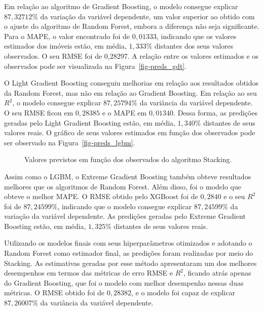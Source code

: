 \documentclass[
  12pt,
  a4paper,
]{scrreprt}
\begin{document}
\vspace{12pt}

Em relação ao algoritmo de Gradient Boosting, o modelo consegue explicar
\(87,32712\%\) da variação da variável dependente, um valor superior ao
obtido com o ajuste do algoritmo de Random Forest, embora a diferença
não seja significante. Para o MAPE, o valor encontrado foi de
\(0,01333\), indicando que os valores estimados dos imóveis estão, em
média, \(1,333\%\) distantes dos seus valores observados. O seu RMSE foi
de 0,28297. A relação entre os valores estimados e os observados pode
ser visualizada na Figura~\ref{fig-preds_gdt}.

\vspace{12pt}

O Light Gradient Boosting conseguiu melhorias em relação aos resultados
obtidos da Random Forest, mas não em relação ao Gradient Boosting. Em
relação ao seu \(R^2\), o modelo consegue explicar \(87,25794\%\) da
variância da variável dependente. O seu RMSE ficou em \(0,28385\) e o
MAPE em \(0,01340\). Dessa forma, as predições geradas pelo Light
Gradient Boosting estão, em média, \(1,340\%\) distantes de seus valores
reais. O gráfico de seus valores estimados em função dos observados pode
ser observado na Figura~\ref{fig-preds_lgbm}.

\begin{figure}


\caption{\label{fig-preds_stacking}Valores previstos em função dos
observados do algoritmo Stacking.}

\end{figure}%

Assim como o LGBM, o Extreme Gradient Boosting também obteve resultados
melhores que os algoritmos de Random Forest. Além disso, foi o modelo
que obteve o melhor MAPE. O RMSE obtido pelo XGBoost foi de \(0,2840\) e
o seu \(R^2\) foi de \(87,24599\%\), indicando que o modelo consegue
explicar \(87,24599\%\) da variação da variável dependente. As predições
geradas pelo Extreme Gradient Boosting estão, em média, \(1,325\%\)
distantes de seus valores reais.

\vspace{12pt}

Utilizando os modelos finais com seus hiperparâmetros otimizados e
adotando o Random Forest como estimador final, as predições foram
realizadas por meio do Stacking. As estimativas geradas por esse método
apresentaram um dos melhores desempenhos em termos das métricas de erro
RMSE e \(R^2\), ficando atrás apenas do Gradient Boosting, que foi o
modelo com melhor desempenho nessas duas métricas. O RMSE obtido foi de
\(0,28382\), e o modelo foi capaz de explicar \(87,26007\%\) da
variância da variável dependente.
\end{document}
